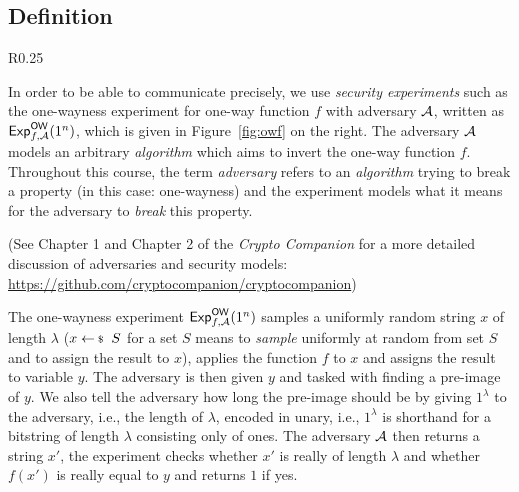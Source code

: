 \documentclass[a4paper,table,dvipsnames]{article}
\theoremstyle{definition}
\begin{document}
\subsection{Definition}
\begin{wrapfigure}{R}{0.25\textwidth}
\vspace{-0.8cm}
\begin{center}
\end{center}
\caption{Security experiment for one-wayness.}
\label{fig:owf}
\vspace{-0.5cm}
\end{wrapfigure}

In order to be able to communicate precisely, we use \emph{security experiments} such as the one-wayness experiment for one-way function $f$ with adversary $\mathcal{A}$, written as ${\sf{Exp}}_{f,\mathcal{A}}^{\sf{OW}}(1^n)$, which is given in Figure~\ref{fig:owf} on the right. The adversary $\mathcal{A}$ models an arbitrary \emph{algorithm} which aims to invert the one-way function $f$. Throughout this course, the term \emph{adversary} refers to an \emph{algorithm} trying to break a property (in this case: one-wayness) and the experiment models what it means for the adversary to \emph{break} this property.

\medskip
\small
(See Chapter 1 and Chapter 2 of the \emph{Crypto Companion} for a more detailed discussion of adversaries and security models: \url{https://github.com/cryptocompanion/cryptocompanion})

\medskip
\normalsize
The one-wayness experiment ${\sf{Exp}}_{f,\mathcal{A}}^{\sf{OW}}(1^n)$ samples a uniformly random string $x$ of length $\lambda$ ($x \sample S$ for a set $S$ means to \emph{sample} uniformly at random from set $S$ and to assign the result to $x$), applies the function $f$ to $x$ and assigns the result to variable $y$. The adversary is then given $y$ and tasked with finding a pre-image of $y$. We also tell the adversary how long the pre-image should be by giving $1^\lambda$ to the adversary, i.e., the length of $\lambda$, encoded in unary, i.e., $1^\lambda$ is shorthand for a bitstring of length $\lambda$ consisting only of ones. The adversary $\mathcal{A}$ then returns a string $x'$, the experiment checks whether $x'$ is really of length $\lambda$ and whether $f(x')$ is really equal to $y$ and returns $1$ if yes.
\end{document}
